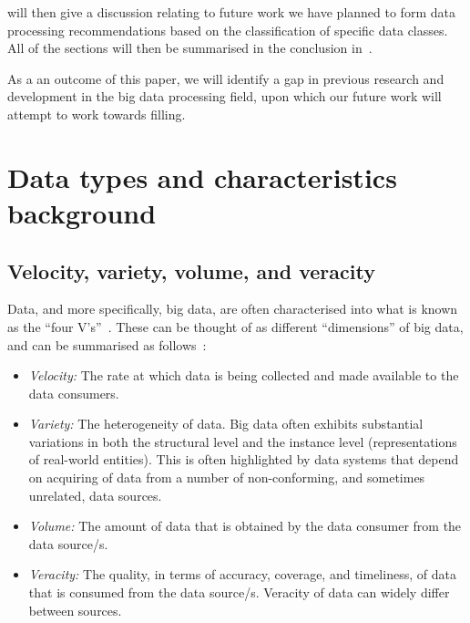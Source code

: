 \documentclass[a4paper,11pt]{article}
\begin{document}
 will then give a discussion relating to future work
we have planned to form data processing recommendations based on the classification of specific data classes. All of the
sections will then be summarised in the conclusion in~.

As a an outcome of this paper, we will identify a gap in previous research and development in the big data processing
field, upon which our future work will attempt to work towards filling.



\section{Data types and characteristics background} %
\label{sec:big_data_types_background}

\subsection{Velocity, variety, volume, and veracity} %
\label{sub:velocity_variety_volume_and_veracity}

Data, and more specifically, big data, are often characterised into what is known as the ``four V's''~\cite{wang2014bigdatabench}.
These can be thought of as different ``dimensions'' of big data, and can be summarised as follows~\cite{dong2013big}:

\begin{itemize}
  \item \emph{Velocity:} The rate at which data is being collected and made available to the data consumers.
  \item \emph{Variety:} The heterogeneity of data. Big data often exhibits substantial variations in both the structural
  level and the instance level (representations of real-world entities). This is often highlighted by data systems that
  depend on acquiring of data from a number of non-conforming, and sometimes unrelated, data sources.
  \item \emph{Volume:} The amount of data that is obtained by the data consumer from the data source/s.
  \item \emph{Veracity:} The quality, in terms of accuracy, coverage, and timeliness, of data that is consumed from
  the data source/s. Veracity of data can widely differ between sources.
\end{itemize}
\end{document}
